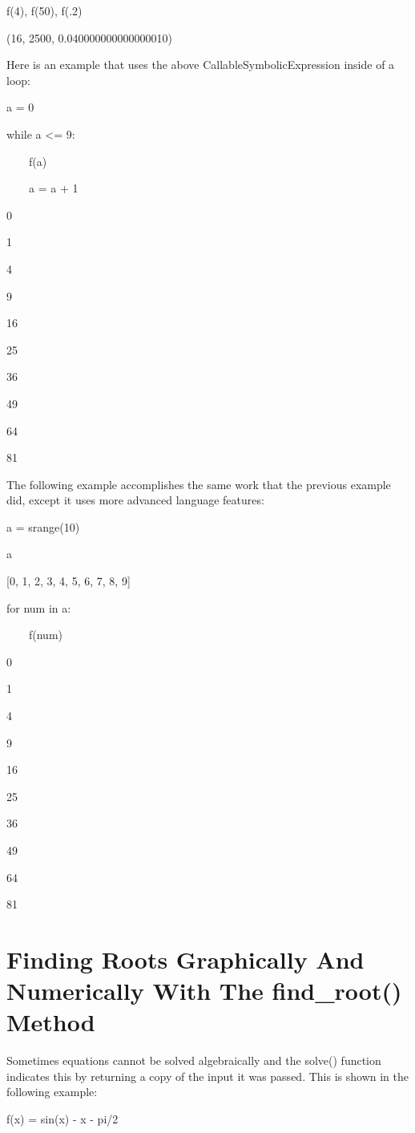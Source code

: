 \documentclass[12pt,oneside]{book}
\begin{document}
f(4), f(50), f(.2)

{\textbar}

(16, 2500, 0.040000000000000010)

Here is an example that uses the above CallableSymbolicExpression inside of a loop: 

a = 0

while a {\textless}= 9:

\ \ \ \ f(a)

\ \ \ \ a = a + 1

{\textbar}

0

1

4

9

16

25

36

49

64

81


The following example accomplishes the same work that the previous example did, except it uses more advanced language features: 

a = srange(10)

a

{\textbar}

[0, 1, 2, 3, 4, 5, 6, 7, 8, 9]


for num in a:

\ \ \ \ f(num)

{\textbar}

0

1

4

9

16

25

36

49

64

81

\section[Finding Roots Graphically And Numerically With The find\_root() Method]{Finding Roots Graphically And Numerically With The find\_root() Method}

Sometimes equations cannot be solved algebraically and the solve() function indicates this by returning a copy of the input it was passed. This is shown in the following example: 

f(x) = sin(x) {}- x {}- pi/2
\end{document}
